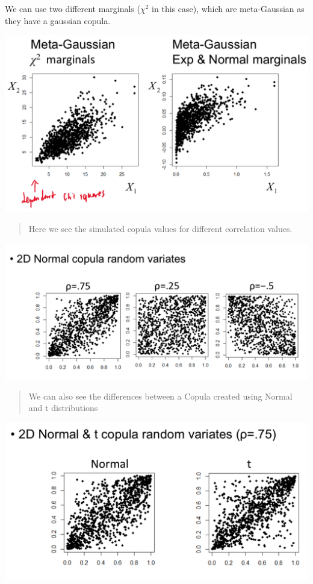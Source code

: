 \documentclass[
  oneside]{book}
\begin{document}
We can use two different marginals (\(\chi^{2}\) in this case), which are meta-Gaussian as they have a gaussian copula.

\includegraphics{Notes/Obsidian-Attachments/4-Multivariate-Return-Modelling-4.png}

\begin{quote}
Here we see the simulated copula values for different correlation values.
\end{quote}

\includegraphics{Notes/Obsidian-Attachments/4-Multivariate-Return-Modelling-5.png}

\begin{quote}
We can also see the differences between a Copula created using Normal and t distributions
\end{quote}

\includegraphics{Notes/Obsidian-Attachments/4-Multivariate-Return-Modelling-6.png}
\end{document}
